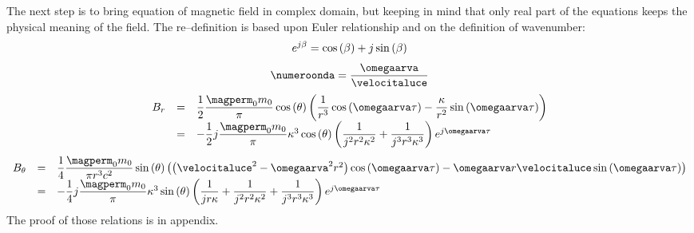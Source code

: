 The next step is to bring equation of magnetic field in complex domain, but keeping in mind that only real part of the equations keeps the physical meaning of the field. The re--definition is based upon Euler relationship and on the definition of wavenumber:
\[
e^{j\beta} = \cos\left( \beta \right) + j \sin\left( \beta \right)
\]
\[
\numeroonda = \dfrac{\omegaarva}{\velocitaluce}
\]
\begin{equation}
\begin{array}{rcl}
B_r & = & \dfrac{1}{2} \dfrac{\magperm_0 m_0}{\pi} \ccos{\theta} \braces{\dfrac{1}{r^3}\ccos{\omegaarva \tau} - \dfrac{\kappa}{r^2} \ssin{\omegaarva \tau}} \\
 & = & -\dfrac{1}{2} j \dfrac{\magperm_0 m_0}{\pi} \kappa^3 \ccos{\theta} \braces{\dfrac{1}{j^2 r^2 \kappa^2} + \dfrac{1}{j^3 r^3 \kappa^3}} e^{j\omegaarva \tau}
\end{array}
\end{equation}
\begin{equation}
\begin{array}{rcl}
B_{\theta} & = & \dfrac{1}{4} \dfrac{\magperm_0 m_0}{\pi r^3 c^2} \ssin{\theta} \braces{\braces{\velocitaluce^2 - \omegaarva^2 r^2}\ccos{\omegaarva \tau} - \omegaarva r \velocitaluce \ssin{\omegaarva \tau}} \\
 & = & -\dfrac{1}{4} j \dfrac{\magperm_0 m_0}{\pi} \kappa^3 \ssin{\theta} \braces{\dfrac{1}{j r \kappa} + \dfrac{1}{j^2 r^2 \kappa^2} + \dfrac{1}{j^3 r^3 \kappa^3}} e^{j\omegaarva \tau}
\end{array}
\end{equation}
The proof of those relations is in appendix.

